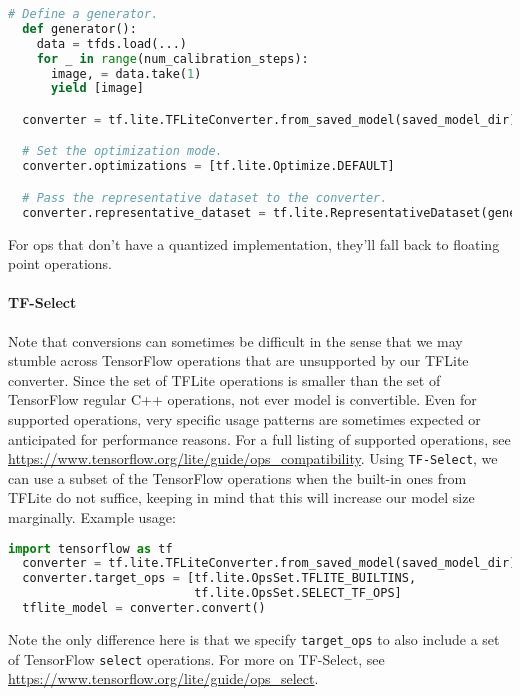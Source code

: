 \documentclass[12pt]{article}
\begin{document}
\begin{lstlisting}[language=Python]
  # Define a generator.
  def generator():
    data = tfds.load(...)
    for _ in range(num_calibration_steps):
      image, = data.take(1)
      yield [image]

  converter = tf.lite.TFLiteConverter.from_saved_model(saved_model_dir)

  # Set the optimization mode.
  converter.optimizations = [tf.lite.Optimize.DEFAULT]

  # Pass the representative dataset to the converter.
  converter.representative_dataset = tf.lite.RepresentativeDataset(generator)
\end{lstlisting}
For ops that don't have a quantized implementation, they'll fall back to floating point operations.
\paragraph{TF-Select} Note that conversions can sometimes be difficult in the sense that we may stumble across TensorFlow operations that are unsupported by our TFLite converter. Since the set of TFLite operations is smaller than the set of TensorFlow regular C++ operations, not ever model is convertible. Even for supported operations, very specific usage patterns are sometimes expected or anticipated for performance reasons. For a full listing of supported operations, see \url{https://www.tensorflow.org/lite/guide/ops_compatibility}. Using \texttt{TF-Select}, we can use a subset of the TensorFlow operations when the built-in ones from TFLite do not suffice, keeping in mind that this will increase our model size marginally. Example usage:
\begin{lstlisting}[language=Python]
  import tensorflow as tf
  converter = tf.lite.TFLiteConverter.from_saved_model(saved_model_dir)
  converter.target_ops = [tf.lite.OpsSet.TFLITE_BUILTINS,
                          tf.lite.OpsSet.SELECT_TF_OPS]
  tflite_model = converter.convert()
\end{lstlisting}
Note the only difference here is that we specify \texttt{target\_ops} to also include a set of TensorFlow \texttt{select} operations.
For more on TF-Select, see
\url{https://www.tensorflow.org/lite/guide/ops_select}.
\end{document}
